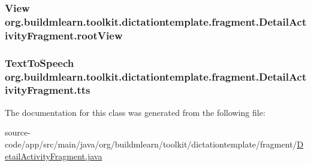 \subsubsection[{\texorpdfstring{root\+View}{rootView}}]{\setlength{\rightskip}{0pt plus 5cm}View org.\+buildmlearn.\+toolkit.\+dictationtemplate.\+fragment.\+Detail\+Activity\+Fragment.\+root\+View\hspace{0.3cm}{\ttfamily [private]}}\hypertarget{classorg_1_1buildmlearn_1_1toolkit_1_1dictationtemplate_1_1fragment_1_1DetailActivityFragment_af4e345b3af7deeb12727648699ce12fb}{}\label{classorg_1_1buildmlearn_1_1toolkit_1_1dictationtemplate_1_1fragment_1_1DetailActivityFragment_af4e345b3af7deeb12727648699ce12fb}
\subsubsection[{\texorpdfstring{tts}{tts}}]{\setlength{\rightskip}{0pt plus 5cm}Text\+To\+Speech org.\+buildmlearn.\+toolkit.\+dictationtemplate.\+fragment.\+Detail\+Activity\+Fragment.\+tts\hspace{0.3cm}{\ttfamily [private]}}\hypertarget{classorg_1_1buildmlearn_1_1toolkit_1_1dictationtemplate_1_1fragment_1_1DetailActivityFragment_af48d0b5c8abacce32ab36b327d15be60}{}\label{classorg_1_1buildmlearn_1_1toolkit_1_1dictationtemplate_1_1fragment_1_1DetailActivityFragment_af48d0b5c8abacce32ab36b327d15be60}


The documentation for this class was generated from the following file\+:\begin{DoxyCompactItemize}
\item 
source-\/code/app/src/main/java/org/buildmlearn/toolkit/dictationtemplate/fragment/\hyperlink{dictationtemplate_2fragment_2DetailActivityFragment_8java}{Detail\+Activity\+Fragment.\+java}\end{DoxyCompactItemize}
